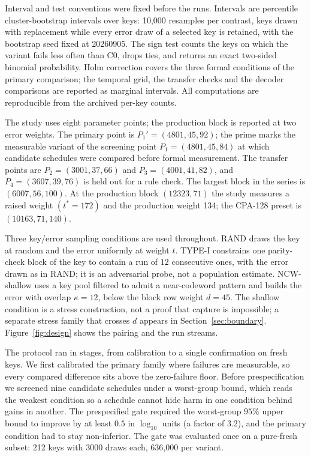 \documentclass[letterpaper,journal]{IEEEtran}
\begin{document}
Interval and test conventions were fixed before the runs. Intervals are percentile cluster-bootstrap intervals over keys: 10{,}000 resamples per contrast, keys drawn with replacement while every error draw of a selected key is retained, with the bootstrap seed fixed at 20260905. The sign test counts the keys on which the variant fails less often than C0, drops ties, and returns an exact two-sided binomial probability. Holm correction covers the three formal conditions of the primary comparison; the temporal grid, the transfer checks and the decoder comparisons are reported as marginal intervals. All computations are reproducible from the archived per-key counts.

The study uses eight parameter points; the production block is reported at two error weights. The primary point is $P_1'=(4801,45,92)$; the prime marks the measurable variant of the screening point $P_1=(4801,45,84)$ at which candidate schedules were compared before formal measurement. The transfer points are $P_2=(3001,37,66)$ and $P_3=(4001,41,82)$, and $P_4=(3607,39,76)$ is held out for a rule check. The largest block in the series is $(6007,56,100)$. At the production block $(12323,71)$ the study measures a raised weight $(t^{\ast}=172)$ and the production weight 134; the CPA-128 preset is $(10163,71,140)$.

Three key/error sampling conditions are used throughout. RAND draws the key at random and the error uniformly at weight $t$. TYPE-I constrains one parity-check block of the key to contain a run of $12$ consecutive ones, with the error drawn as in RAND; it is an adversarial probe, not a population estimate. NCW-shallow uses a key pool filtered to admit a near-codeword pattern and builds the error with overlap $\kappa=12$, below the block row weight $d=45$. The shallow condition is a stress construction, not a proof that capture is impossible; a separate stress family that crosses $d$ appears in Section~\ref{sec:boundary}. Figure~\ref{fig:design} shows the pairing and the run streams.

The protocol ran in stages, from calibration to a single confirmation on fresh keys. We first calibrated the primary family where failures are measurable, so every compared difference sits above the zero-failure floor. Before prespecification we screened nine candidate schedules under a worst-group bound, which reads the weakest condition so a schedule cannot hide harm in one condition behind gains in another. The prespecified gate required the worst-group $95\%$ upper bound to improve by at least $0.5$ in $\log_{10}$ units (a factor of 3.2), and the primary condition had to stay non-inferior. The gate was evaluated once on a pure-fresh subset: 212 keys with 3000 draws each, 636{,}000 per variant.
\end{document}
